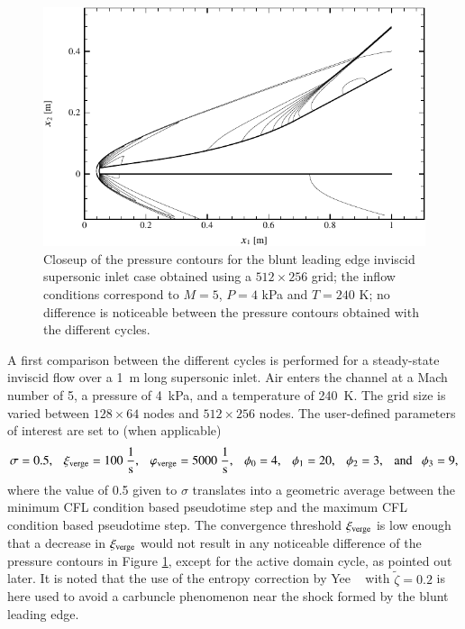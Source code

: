 %
\begin{figure}[!b]
   \includegraphics[width=6.3\lengthfigure]{fig3/ParentFig6.pdf}
\caption{Closeup of the pressure contours for the blunt leading edge inviscid supersonic inlet
         case obtained using a $512 \times 256$ grid;
         the inflow conditions correspond to $M=5$, $P=4$ kPa and $T=240$ K;
         no difference is noticeable between the pressure contours obtained
         with the different cycles.}
\label{fig:inlet-P}
\end{figure}
%





A first comparison between the different cycles is performed for a steady-state
inviscid flow over a 1~m long supersonic inlet. Air enters the channel at a Mach
number of 5, a pressure of 4~kPa, and a temperature of 240~K. The grid
size is varied between $128 \times 64$ nodes and $512 \times 256$
nodes. The user-defined parameters of interest are set to (when applicable)
%
\begin{displaymath}
 \sigma=0.5,~~~ {\xi_{\rm verge}}=100~\frac{1}{\rm s},~~~ {\varphi_{\rm verge}}=5000~\frac{1}{\rm s},
          ~~~\phi_0=4, ~~~ \phi_1=20, ~~~\phi_2=3, ~~~{\rm and}~~~\phi_3=9,
\end{displaymath}
%
where the value of 0.5 given to $\sigma$ translates into a geometric average
between the minimum CFL condition based pseudotime step and the maximum CFL
condition based pseudotime step. The convergence threshold ${\xi_{\rm verge}}$ is low
enough that a decrease in ${\xi_{\rm verge}}$ would not result in any noticeable
difference of the pressure contours in Figure \ref{fig:inlet-P}, except for the
active domain cycle, as pointed out later. It is noted that the use of
the entropy correction by Yee \etal\ \cite{jcp:1990:yee} with $\widetilde{\zeta}=0.2$
is here used to avoid a carbuncle
phenomenon near the shock formed by the blunt leading edge.

